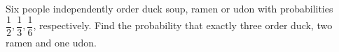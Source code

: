 Six people independently order duck soup, ramen or udon with probabilities $\dfrac{1}{2},\dfrac{1}{3},\dfrac{1}{6}$, respectively. Find the probability that exactly three order duck, two ramen and one udon.
